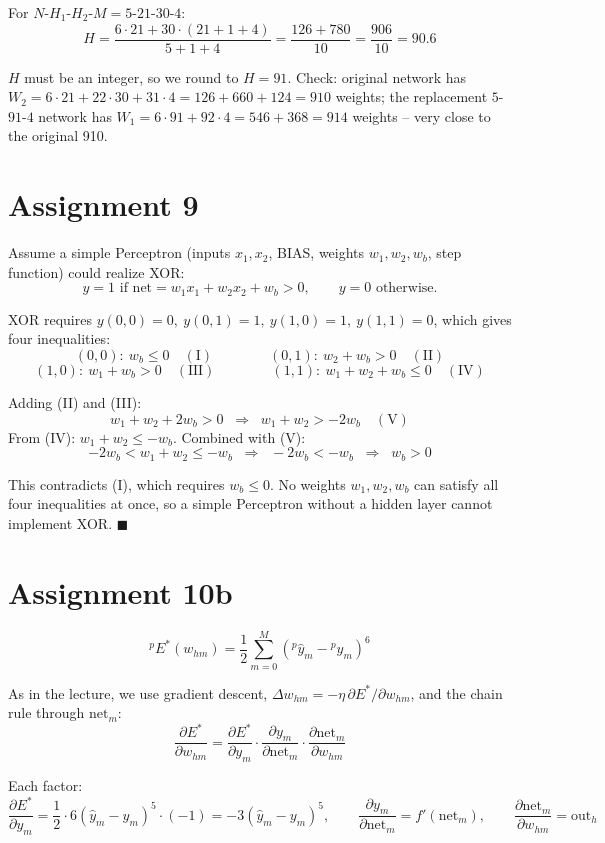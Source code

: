 \documentclass[11pt,a4paper]{article}
\begin{document}
For $N$-$H_1$-$H_2$-$M = 5$-$21$-$30$-$4$:
\[
  H = \frac{6\cdot21 + 30\cdot(21+1+4)}{5+1+4} = \frac{126+780}{10} = \frac{906}{10} = 90.6
\]

$H$ must be an integer, so we round to $H=91$. Check: original network has
$W_2 = 6\cdot21+22\cdot30+31\cdot4 = 126+660+124 = 910$ weights; the replacement $5$-$91$-$4$ network has
$W_1 = 6\cdot91+92\cdot4 = 546+368 = 914$ weights -- very close to the original 910.

\section*{Assignment 9}

Assume a simple Perceptron (inputs $x_1,x_2$, BIAS, weights $w_1,w_2,w_b$, step function) could realize XOR:
\[
  y = 1 \text{ if } \mathrm{net}=w_1x_1+w_2x_2+w_b>0, \qquad y=0 \text{ otherwise.}
\]

XOR requires $y(0,0)=0,\ y(0,1)=1,\ y(1,0)=1,\ y(1,1)=0$, which gives four inequalities:
\[
  (0,0):\ w_b \le 0 \quad (\mathrm{I}) \qquad\qquad
  (0,1):\ w_2+w_b > 0 \quad (\mathrm{II})
\]
\[
  (1,0):\ w_1+w_b > 0 \quad (\mathrm{III}) \qquad\qquad
  (1,1):\ w_1+w_2+w_b \le 0 \quad (\mathrm{IV})
\]

Adding (II) and (III):
\[
  w_1+w_2+2w_b > 0 \;\;\Longrightarrow\;\; w_1+w_2 > -2w_b \quad (\mathrm{V})
\]
From (IV): $w_1+w_2 \le -w_b$. Combined with (V):
\[
  -2w_b < w_1+w_2 \le -w_b \;\;\Longrightarrow\;\; -2w_b < -w_b \;\;\Longrightarrow\;\; w_b > 0
\]

This contradicts (I), which requires $w_b\le 0$. No weights $w_1,w_2,w_b$ can satisfy all four inequalities at once,
so a simple Perceptron without a hidden layer cannot implement XOR. $\blacksquare$

\section*{Assignment 10b}

\[
  {}^pE^*(w_{hm}) = \frac12\sum_{m=0}^{M}\left({}^p\hat y_m - {}^py_m\right)^6
\]

As in the lecture, we use gradient descent, $\Delta w_{hm}=-\eta\,\partial E^*/\partial w_{hm}$, and the chain rule
through $\mathrm{net}_m$:
\[
  \frac{\partial E^*}{\partial w_{hm}} = \frac{\partial E^*}{\partial y_m}\cdot\frac{\partial y_m}{\partial \mathrm{net}_m}\cdot\frac{\partial \mathrm{net}_m}{\partial w_{hm}}
\]

Each factor:
\[
  \frac{\partial E^*}{\partial y_m} = \frac12\cdot 6(\hat y_m-y_m)^5\cdot(-1) = -3(\hat y_m-y_m)^5,
  \qquad
  \frac{\partial y_m}{\partial \mathrm{net}_m} = f'(\mathrm{net}_m),
  \qquad
  \frac{\partial \mathrm{net}_m}{\partial w_{hm}} = \mathrm{out}_h
\]
\end{document}
